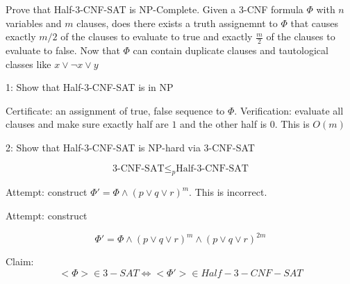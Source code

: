 \documentclass[../notes.tex]{subfiles}
\begin{document}
\begin{example}

	Prove that Half-3-CNF-SAT is NP-Complete. Given a 3-CNF formula $ \Phi $ with $ n $ variables and $  m $ clauses, does there exists a truth assignemnt to $ \Phi $ that causes exactly $ m/2 $ of the clauses to evaluate to true and exactly $ \frac{m}{2} $ of the clauses to evaluate to false. Now that $ \Phi  $ can contain duplicate clauses and tautological classes like $ x \lor \neg x \lor y  $


	1: Show that Half-3-CNF-SAT is in NP

	Certificate: an assignment of true, false sequence to $ \Phi $.
	Verification: evaluate all clauses and make sure exactly half are $ 1 $ and the other half is $ 0 $. This is $ O(m) $


	2: Show that Half-3-CNF-SAT is NP-hard via 3-CNF-SAT

	\begin{equation}
		\text{3-CNF-SAT} \le_p \text{Half-3-CNF-SAT}
	\end{equation}

	Attempt: construct $ \Phi' = \Phi \land (p\lor q \lor r )^m$. This is incorrect.

	Attempt: construct

	\begin{equation}
		\Phi' = \Phi \land (p \lor q \lor r )^m \land (p \lor q \lor r )^{2m}
	\end{equation}

	Claim: 
	\begin{equation}
		<\Phi> \in 3-SAT \Leftrightarrow <\Phi'> \in Half-3-CNF-SAT
	\end{equation}
	
	


	
	




	
\end{example}
\end{document}
